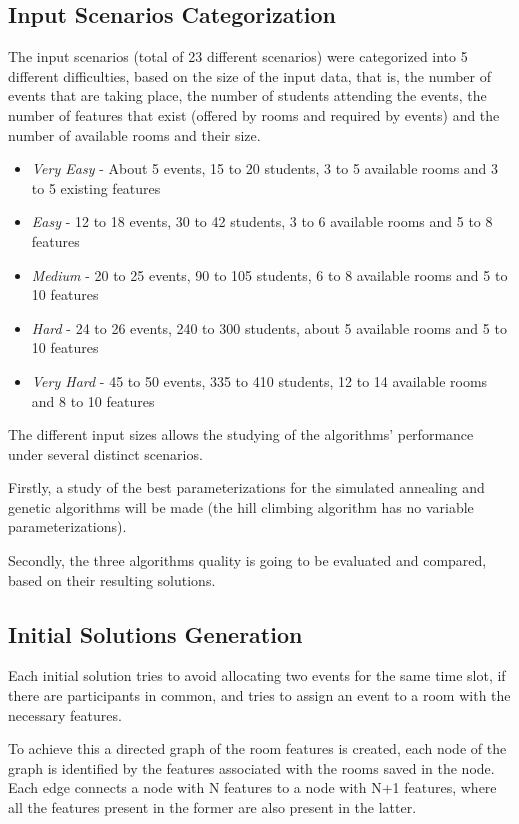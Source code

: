 \documentclass[conference]{IEEEtran}
\begin{document}
\subsection{Input Scenarios Categorization}

The input scenarios (total of 23 different scenarios) were categorized into 5 different difficulties, based on the size of the input data, that is, the number of events that are taking place, the number of students attending the events, the number of features that exist (offered by rooms and required by events) and the number of available rooms and their size.

\begin{itemize}
    \item \textit{Very Easy} - About 5 events, 15 to 20 students, 3 to 5 available rooms and 3 to 5 existing features 
    \item \textit{Easy} - 12 to 18 events, 30 to 42 students, 3 to 6 available rooms and 5 to 8 features 
    \item \textit{Medium} - 20 to 25 events, 90 to 105 students, 6 to 8 available rooms and 5 to 10 features
    \item \textit{Hard} - 24 to 26 events, 240 to 300 students, about 5 available rooms and 5 to 10 features
    \item \textit{Very Hard} - 45 to 50 events, 335 to 410 students, 12 to 14 available rooms and 8 to 10 features
\end{itemize}

The different input sizes allows the studying of the algorithms' performance under several distinct scenarios.

Firstly, a study of the best parameterizations for the simulated annealing and genetic algorithms will be made (the hill climbing algorithm has no variable parameterizations).

Secondly, the three algorithms quality is going to be evaluated and compared, based on their resulting solutions.

\subsection{Initial Solutions Generation} \label{subsec:isg}

Each initial solution tries to avoid allocating two events for the same time slot, if there are participants in common, and tries to assign an event to a room with the necessary features.

To achieve this a directed graph of the room features is created, each node of the graph is identified by the features associated with the rooms saved in the node. Each edge connects a node with N features to a node with N+1 features, where all the features present in the former are also present in the latter.
\end{document}
